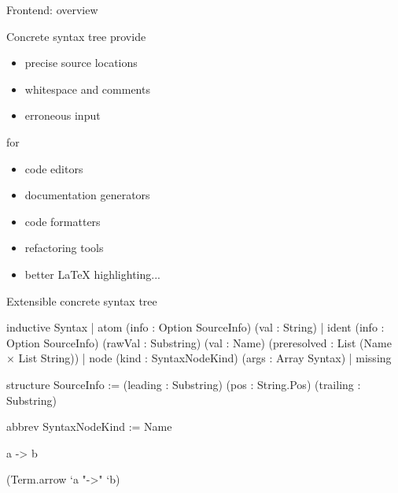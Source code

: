 \documentclass[t]{beamer}
\begin{document}
\begin{frame}[fragile]{Frontend: overview}
  \begin{center}
  \end{center} 
\end{frame}

\begin{frame}[fragile]{Concrete syntax tree}
  provide
  \begin{itemize}
  \item precise source locations
  \item whitespace and comments
  \item erroneous input
  \end{itemize}
  for
  \begin{itemize}
  \item code editors
  \item documentation generators
  \item code formatters
  \item refactoring tools
  \item better LaTeX highlighting...
  \end{itemize}
\end{frame}

\begin{frame}{Extensible concrete syntax tree}
\begin{leancode}
inductive Syntax
| atom   (info : Option SourceInfo) (val : String)
| ident  (info : Option SourceInfo) (rawVal : Substring) (val : Name) (preresolved : List (Name × List String))
| node   (kind : SyntaxNodeKind) (args : Array Syntax)
| missing

structure SourceInfo :=
(leading  : Substring)
(pos      : String.Pos)
(trailing : Substring)

abbrev SyntaxNodeKind := Name
\end{leancode}

\begin{leancode}
a -> b
\end{leancode}

\begin{leancode}
(Term.arrow `a "->" `b)
\end{leancode}
\end{frame}
\end{document}
